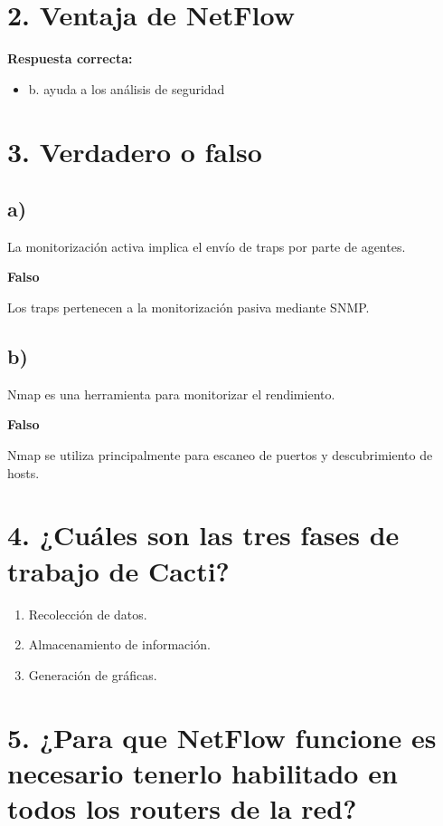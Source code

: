 \documentclass[12pt]{article}
\begin{document}
\section*{2. Ventaja de NetFlow}

\textbf{Respuesta correcta:}

\begin{itemize}
    \item b. ayuda a los análisis de seguridad
\end{itemize}

\section*{3. Verdadero o falso}

\subsection*{a)}
La monitorización activa implica el envío de traps por parte de agentes.

\textbf{Falso}

Los traps pertenecen a la monitorización pasiva mediante SNMP.

\subsection*{b)}
Nmap es una herramienta para monitorizar el rendimiento.

\textbf{Falso}

Nmap se utiliza principalmente para escaneo de puertos y descubrimiento de hosts.

\section*{4. ¿Cuáles son las tres fases de trabajo de Cacti?}

\begin{enumerate}
    \item Recolección de datos.
    \item Almacenamiento de información.
    \item Generación de gráficas.
\end{enumerate}

\section*{5. ¿Para que NetFlow funcione es necesario tenerlo habilitado en todos los routers de la red?}
\end{document}
